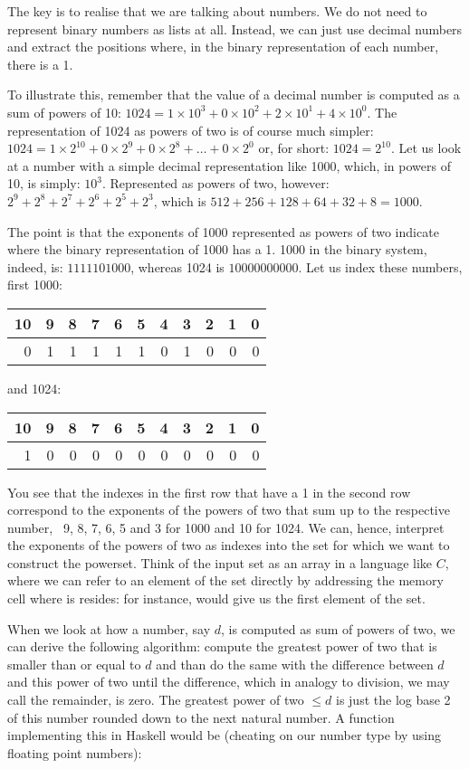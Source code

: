 \documentclass{scrreprt}
\begin{document}
The key is to realise
that we are talking about numbers.
We do not need to represent binary numbers
as lists at all.
Instead, we can just use decimal numbers
and extract the positions
where, in the binary representation of each number,
there is a 1. 

To illustrate this,
remember that the value of a decimal number
is computed as a sum of powers of 10:
$1024 = 1 \times 10^3 + 0 \times 10^2 + 2 \times 10^1 + 4 \times 10^0$.
The representation of \num{1024} as powers of two
is of course much simpler: 
$1024 = 1 \times 2^{10} + 
        0 \times 2^9 + 0 \times 2^8 + \dots + 0 \times 2^0$
or, for short:
$1024 = 2^{10}$.
Let us look at a number
with a simple decimal representation like \num{1000},
which, in powers of 10, is simply:
$10^3$. Represented as powers of two, however:
$2^9 + 2^8 + 2^7 + 2^6 + 2^5 + 2^3$,
which is 
$512 + 256 + 128 + 64 + 32 + 8 = 1000$.

The point is that the exponents
of \num{1000} represented as powers of two
indicate where the binary representation of \num{1000}
has a 1. \num{1000} in the binary system, indeed, is:
$1111101000$, whereas \num{1024} is
$10000000000$.
Let us index these numbers, first \num{1000}:

\begin{tabular}{ r r r r r r r r r r r}
10 & 9 & 8 & 7 & 6 & 5 & 4 & 3 & 2 & 1 & 0\\\hline
 0 & 1 & 1 & 1 & 1 & 1 & 0 & 1 & 0 & 0 & 0
\end{tabular}

and \num{1024}:

\begin{tabular}{ r r r r r r r r r r r}
10 & 9 & 8 & 7 & 6 & 5 & 4 & 3 & 2 & 1 & 0\\\hline
 1 & 0 & 0 & 0 & 0 & 0 & 0 & 0 & 0 & 0 & 0
\end{tabular}

You see that the indexes in the first row
that have a 1 in the second row
correspond to the exponents of the powers
of two that sum up to the respective number,
\ie\ 9, 8, 7, 6, 5 and 3 for \num{1000}
and 10 for \num{1024}.
We can, hence, interpret the exponents of 
the powers of two as indexes into the set
for which we want to construct the powerset.
Think of the input set as an array
in a language like $C$,
where we can refer to an element of the set
directly by addressing the memory cell
where is resides: 
 for instance,
would give us the first element of the set.

When we look at how a number, say $d$, is computed
as sum of powers of two,
we can derive the following algorithm:
compute the greatest power of two
that is smaller than or equal to $d$ 
and than do the same with the difference
between $d$ and this power of two
until the difference,
which in analogy to division,
we may call the remainder,
is zero.
The greatest power of two $\le d$ 
is just the log base 2
of this number rounded down
to the next natural number.
A function implementing this in Haskell
would be (cheating on our number type 
by using floating point numbers):
\end{document}
